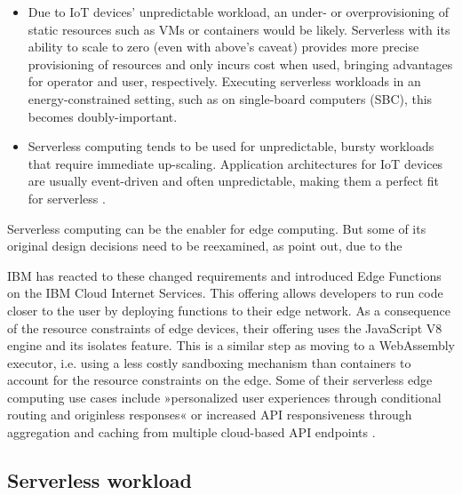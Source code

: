 \begin{itemize}
    \item Due to IoT devices' unpredictable workload, an under- or overprovisioning of static resources such as VMs or containers would be likely. Serverless with its ability to scale to zero (even with above's caveat) provides more precise provisioning of resources and only incurs cost when used, bringing advantages for operator and user, respectively. Executing serverless workloads in an energy-constrained setting, such as on single-board computers (SBC), this becomes doubly-important.
    \item Serverless computing tends to be used for unpredictable, bursty workloads that require immediate up-scaling. Application architectures for IoT devices are usually event-driven and often unpredictable, making them a perfect fit for serverless \cite{Aslanpour2021}.
\end{itemize}

Serverless computing can be the enabler for edge computing. But some of its original design decisions need to be reexamined, as \citeauthor{Nastic2018} point out, due to the

\begin{quote}
\end{quote}

IBM has reacted to these changed requirements and introduced Edge Functions on the IBM Cloud Internet Services. This offering allows developers to run code closer to the user by deploying functions to their edge network. As a consequence of the resource constraints of edge devices, their offering uses the JavaScript V8 engine and its isolates feature. This is a similar step as moving to a WebAssembly executor, i.e. using a less costly sandboxing mechanism than containers to account for the resource constraints on the edge. Some of their serverless edge computing use cases include »personalized user experiences through conditional routing and originless responses« or increased API responsiveness through aggregation and caching from multiple cloud-based API endpoints \cite{Farid2019}.

\subsection{Serverless workload}
\label{section:serverless_workload}

